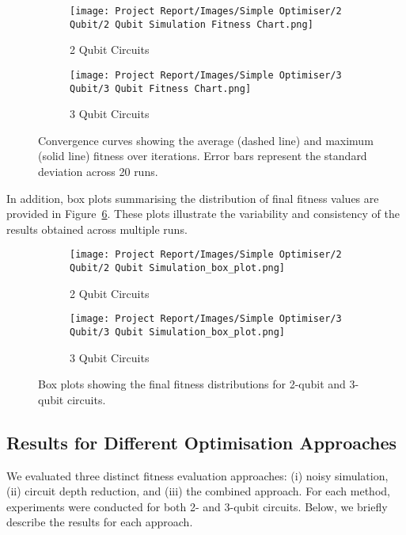 \documentclass[11pt,a4paper]{article}
\begin{document}
\begin{figure}[H]
\centering
\begin{subfigure}{.5\textwidth}
  \centering
  \texttt{[image: Project Report/Images/Simple Optimiser/2 Qubit/2 Qubit Simulation Fitness Chart.png]}
  \caption{2 Qubit Circuits}
  \label{fig:sub1}
\end{subfigure}%
\begin{subfigure}{.5\textwidth}
  \centering
  \texttt{[image: Project Report/Images/Simple Optimiser/3 Qubit/3 Qubit Fitness Chart.png]}
  \caption{3 Qubit Circuits}
  \label{fig:sub2}
\end{subfigure}
\caption{Convergence curves showing the average (dashed line) and maximum (solid line) fitness over iterations. Error bars represent the standard deviation across 20 runs.}
\label{fig:fitness_charts}
\end{figure}

In addition, box plots summarising the distribution of final fitness values are provided in Figure~\ref{fig:boxplots}. These plots illustrate the variability and consistency of the results obtained across multiple runs.

\begin{figure}[H]
\centering
\begin{subfigure}{.5\textwidth}
  \centering
  \texttt{[image: Project Report/Images/Simple Optimiser/2 Qubit/2 Qubit Simulation\_box\_plot.png]}
  \caption{2 Qubit Circuits}
  \label{fig:sub1}
\end{subfigure}%
\begin{subfigure}{.5\textwidth}
  \centering
  \texttt{[image: Project Report/Images/Simple Optimiser/3 Qubit/3 Qubit Simulation\_box\_plot.png]}
  \caption{3 Qubit Circuits}
  \label{fig:sub2}
\end{subfigure}
\caption{Box plots showing the final fitness distributions for 2-qubit and 3-qubit circuits.}
\label{fig:boxplots}
\end{figure}

\subsection{Results for Different Optimisation Approaches}
We evaluated three distinct fitness evaluation approaches: (i) noisy simulation, (ii) circuit depth reduction, and (iii) the combined approach. For each method, experiments were conducted for both 2- and 3-qubit circuits. Below, we briefly describe the results for each approach.
\end{document}
